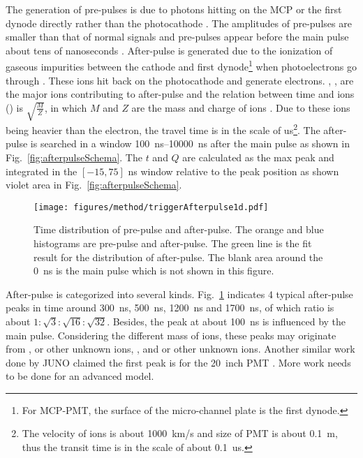 The generation of pre-pulses is due to photons hitting on the MCP or the first dynode directly rather than the photocathode \cite{JUNOMassTesting}. The amplitudes of pre-pulses are smaller than that of normal signals and pre-pulses appear before the main pulse about tens of nanoseconds \cite{JUNOMassTesting}. After-pulse is generated due to the ionization of gaseous impurities between the cathode and first dynode\footnote{For MCP-PMT, the surface of the micro-channel plate is the first dynode.} when photoelectrons go through \cite{Coates_1973}. These ions hit back on the photocathode and generate electrons. , ,  are the major ions contributing to after-pulse and the relation between time and ions () is $\sqrt{\frac{M}{Z}}$, in which $M$ and $Z$ are the mass and charge of ions \cite{Coates_1973}. Due to these ions being heavier than the electron, the travel time is in the scale of \si{us}\footnote{The velocity of ions is about \SI{1000}{km/s} and size of PMT is about \SI{0.1}{m}, thus the transit time is in the scale of about \SI{0.1}{us}.}. The after-pulse is searched in a window \SIrange{100}{10000}{ns} after the main pulse as shown in Fig.~\ref{fig:afterpulseSchema}. The $t$ and $Q$ are calculated as the max peak and integrated in the $[-15,75]$ ns window relative to the peak position as shown violet area in Fig.~\ref{fig:afterpulseSchema}.

\begin{figure}[!htbp]
    \centering
    \texttt{[image: figures/method/triggerAfterpulse1d.pdf]}
    \caption{Time distribution of pre-pulse and after-pulse. The orange and blue histograms are pre-pulse and after-pulse. The green line is the fit result for the distribution of after-pulse. The blank area around the \SI{0}{ns} is the main pulse which is not shown in this figure.}
    \label{fig:afterpulse1d}
\end{figure}

After-pulse is categorized into several kinds. Fig.~\ref{fig:afterpulse1d} indicates 4 typical after-pulse peaks in time around \SI{300}{ns}, \SI{500}{ns}, \SI{1200}{ns} and \SI{1700}{ns}, of which ratio is about $1:\sqrt{3}:\sqrt{16}:\sqrt{32}$. Besides, the peak at about \SI{100}{ns} is influenced by the main pulse. Considering the different mass of ions, these peaks may originate from ,  or other unknown ions, , and  or other unknown ions. Another similar work done by JUNO claimed the first peak is  for the \SI{20}{inch} PMT \cite{Zhao:2022gks}. More work needs to be done for an advanced model.

